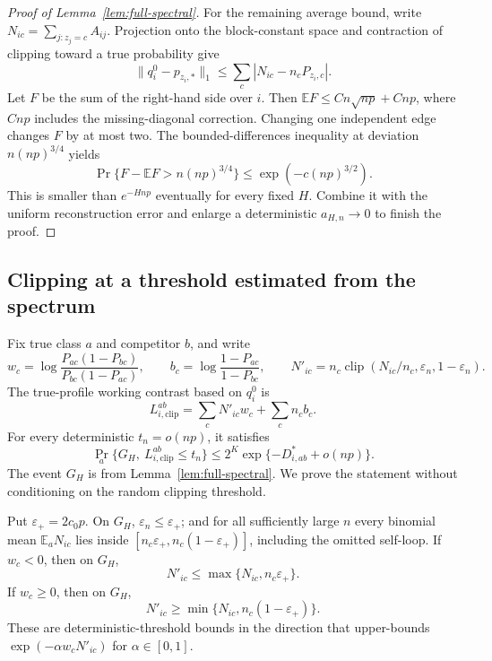 \begin{proof}[Proof of Lemma~\ref{lem:full-spectral}]
For the remaining average bound, write
$N_{ic}=\sum_{j:z_j=c}A_{ij}$.  Projection onto the block-constant
space and contraction of clipping toward a true probability give
\[
 \|q_i^0-p_{z_i,*}\|_1
       \le\sum_c|N_{ic}-n_cP_{z_i,c}|.
\]
Let $F$ be the sum of the right-hand side over $i$.
Then $\mathbb EF\le Cn\sqrt{np}+Cnp$, where $Cnp$ includes the
missing-diagonal correction.  Changing one independent edge
changes $F$ by at most two.  The bounded-differences inequality
at deviation $n(np)^{3/4}$ yields
\[
 \Pr\{F-\mathbb EF>n(np)^{3/4}\}
       \le\exp(-c(np)^{3/2}).
\]
This is smaller than $e^{-Hnp}$ eventually for every fixed $H$.
Combine it with the uniform reconstruction error and enlarge a
deterministic $a_{H,n}\to0$ to finish the proof.
\end{proof}

\subsection{Clipping at a threshold estimated from the spectrum}
\label{app:general-clipped-chernoff}

Fix true class $a$ and competitor $b$, and write
\[
 w_c=\log\frac{P_{ac}(1-P_{bc})}{P_{bc}(1-P_{ac})},
 \qquad b_c=\log\frac{1-P_{ac}}{1-P_{bc}},
 \qquad
 N'_{ic}=n_c\operatorname{clip}
       (N_{ic}/n_c,\varepsilon_n,1-\varepsilon_n).
\]
The true-profile working contrast based on $q_i^0$ is
\begin{equation}
 L_{i,\mathrm{clip}}^{ab}
       =\sum_c N'_{ic}w_c+\sum_c n_cb_c.
 \label{eq:general-clipped-score}
\end{equation}
For every deterministic $t_n=o(np)$, it satisfies
\begin{equation}
 \Pr_a\{G_H,\ L_{i,\mathrm{clip}}^{ab}\le t_n\}
       \le2^K\exp\{-D^*_{i,ab}+o(np)\}.
 \label{eq:general-clipped-chernoff}
\end{equation}
The event $G_H$ is from
Lemma~\ref{lem:full-spectral}.  We prove the statement
without conditioning on the random clipping threshold.

Put $\varepsilon_+=2c_0p$.  On $G_H$,
$\varepsilon_n\le\varepsilon_+$; and for all sufficiently large
$n$ every binomial mean $\mathbb E_aN_{ic}$ lies inside
$[n_c\varepsilon_+,n_c(1-\varepsilon_+)]$, including the omitted
self-loop.  If $w_c<0$, then on $G_H$,
\[
 N'_{ic}\le\max\{N_{ic},n_c\varepsilon_+\}.
\]
If $w_c\ge0$, then on $G_H$,
\[
 N'_{ic}\ge\min\{N_{ic},n_c(1-\varepsilon_+)\}.
\]
These are deterministic-threshold bounds in the direction that
upper-bounds $\exp(-\alpha w_cN'_{ic})$ for $\alpha\in[0,1]$.

